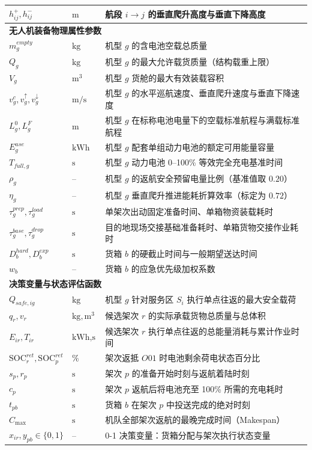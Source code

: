 \documentclass[withoutpreface,bwprint]{format}
\begin{document}
\begin{table}[H]
\begin{tabularx}{\textwidth}{p{3.2cm} p{2.2cm} X}
$h_{ij}^+, h_{ij}^-$ & $\text{m}$ & 航段 $i \to j$ 的垂直爬升高度与垂直下降高度 \\
\midrule
\multicolumn{3}{l}{\textbf{无人机装备物理属性参数}} \\
$m_g^{empty}$ & $\text{kg}$ & 机型 $g$ 的含电池空载总质量 \\
$Q_g$ & $\text{kg}$ & 机型 $g$ 的最大允许载货质量（结构载重上限） \\
$V_g$ & $\text{m}^3$ & 机型 $g$ 货舱的最大有效装载容积 \\
$v_g^c, v_g^\uparrow, v_g^\downarrow$ & $\text{m/s}$ & 机型 $g$ 的水平巡航速度、垂直爬升速度与垂直下降速度 \\
$L_g^0, L_g^F$ & $\text{m}$ & 机型 $g$ 在标称电池电量下的空载标准航程与满载标准航程 \\
$E_g^{use}$ & $\text{kWh}$ & 机型 $g$ 配套单组动力电池的额定可用能量容量 \\
$T_{full, g}$ & $\text{s}$ & 机型 $g$ 动力电池 0--100\% 等效完全充电基准时间 \\
$\rho_g$ & -- & 机型 $g$ 的返航安全预留电量比例（基准值取 $0.20$） \\
$\eta_g$ & -- & 机型 $g$ 垂直爬升推进能耗折算效率（标定为 $0.72$） \\
$\tau_g^{prep}, \tau_g^{load}$ & $\text{s}$ & 单架次出动固定准备时间、单箱物资装载耗时 \\
$\tau_g^{base}, \tau_g^{drop}$ & $\text{s}$ & 目的地现场交接基础准备耗时、单箱货物交接作业耗时 \\
$D_b^{hard}, D_b^{exp}$ & $\text{s}$ & 货箱 $b$ 的硬截止时间与一般期望送达时间 \\
$w_b$ & -- & 货箱 $b$ 的应急优先级加权系数 \\
\midrule
\multicolumn{3}{l}{\textbf{决策变量与状态评估函数}} \\
$Q_{safe, ig}$ & $\text{kg}$ & 机型 $g$ 针对服务区 $S_i$ 执行单点往返的最大安全载荷 \\
$q_r, v_r$ & $\text{kg}, \text{m}^3$ & 候选架次 $r$ 的实际承载货物总质量与总体积 \\
$E_{ir}, T_{ir}$ & $\text{kWh}, \text{s}$ & 候选架次 $r$ 执行单点往返的总能量消耗与累计作业时间 \\
$\text{SOC}_r^{ret}, \text{SOC}_p^{ret}$ & $\%$ & 架次返抵 $O01$ 时电池剩余荷电状态百分比 \\
$s_p, r_p$ & $\text{s}$ & 架次 $p$ 的准备开始时刻与返航着陆时刻 \\
$c_p$ & $\text{s}$ & 架次 $p$ 返航后将电池充至 100\% 所需的充电耗时 \\
$t_{pb}$ & $\text{s}$ & 货箱 $b$ 在架次 $p$ 中投送完成的绝对时刻 \\
$C_{\max}$ & $\text{s}$ & 机队全部架次返航的最晚完成时间（Makespan） \\
$x_{ir}, y_{pb} \in \{0, 1\}$ & -- & 0-1 决策变量：货箱分配与架次执行状态变量 \\
\bottomrule
\end{tabularx}
\end{table}
\end{document}

